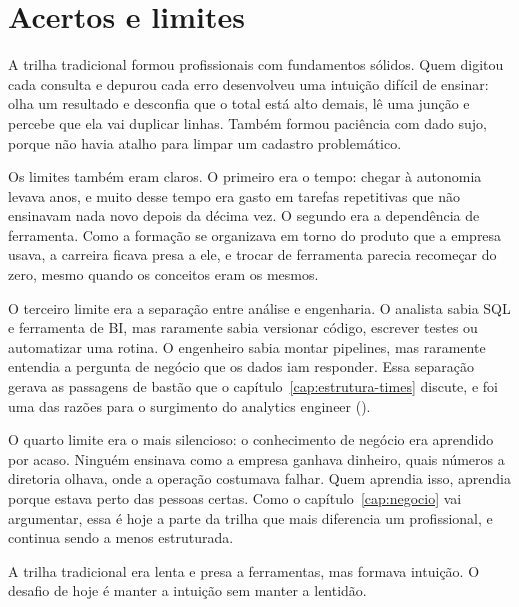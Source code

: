 \section{Acertos e limites}
\label{sec:acertos-limites}

A trilha tradicional formou profissionais com fundamentos sólidos. Quem digitou cada
consulta e depurou cada erro desenvolveu uma intuição difícil de ensinar: olha um resultado
e desconfia que o total está alto demais, lê uma junção e percebe que ela vai duplicar
linhas. Também formou paciência com dado sujo, porque não havia atalho para limpar um
cadastro problemático.

Os limites também eram claros. O primeiro era o tempo: chegar à autonomia levava anos, e
muito desse tempo era gasto em tarefas repetitivas que não ensinavam nada novo depois da
décima vez. O segundo era a dependência de ferramenta. Como a formação se organizava em
torno do produto que a empresa usava, a carreira ficava presa a ele, e trocar de
ferramenta parecia recomeçar do zero, mesmo quando os conceitos eram os mesmos.

O terceiro limite era a separação entre análise e engenharia. O analista sabia SQL e
ferramenta de BI, mas raramente sabia versionar código, escrever testes ou automatizar uma
rotina. O engenheiro sabia montar pipelines, mas raramente entendia a pergunta de negócio
que os dados iam responder. Essa separação gerava as passagens de bastão que o
capítulo~\ref{cap:estrutura-times} discute, e foi uma das razões para o surgimento do
analytics engineer ().

O quarto limite era o mais silencioso: o conhecimento de negócio era aprendido por acaso.
Ninguém ensinava como a empresa ganhava dinheiro, quais números a diretoria olhava, onde a
operação costumava falhar. Quem aprendia isso, aprendia porque estava perto das pessoas
certas. Como o capítulo~\ref{cap:negocio} vai argumentar, essa é hoje a parte da trilha
que mais diferencia um profissional, e continua sendo a menos estruturada.

\begin{destaque}
A trilha tradicional era lenta e presa a ferramentas, mas formava intuição. O desafio de
hoje é manter a intuição sem manter a lentidão.
\end{destaque}

\begin{leituras}
\end{leituras}
